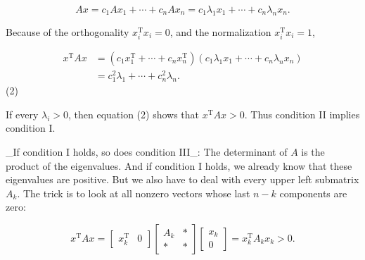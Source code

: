 \[Ax=c_{1}Ax_{1}+\cdots+c_{n}Ax_{n}=c_{1}\lambda_{1}x_{1}+\cdots+c_{n}\lambda_{ n}x_{n}.\]

Because of the orthogonality \(x_{i}^{\mathrm{T}}x_{i}=0\), and the normalization \(x_{i}^{\mathrm{T}}x_{i}=1\),

\[\begin{split} x^{\mathrm{T}}Ax&=\left(c_{1}x_{1}^{ \mathrm{T}}+\cdots+c_{n}x_{n}^{\mathrm{T}}\right)\left(c_{1}\lambda_{1}x_{1}+ \cdots+c_{n}\lambda_{n}x_{n}\right)\\ &=c_{1}^{2}\lambda_{1}+\cdots+c_{n}^{2}\lambda_{n}.\end{split}\] (2)

If every \(\lambda_{i}>0\), then equation (2) shows that \(x^{\mathrm{T}}Ax>0\). Thus condition II implies condition I.

_If condition I holds, so does condition III_: The determinant of \(A\) is the product of the eigenvalues. And if condition I holds, we already know that these eigenvalues are positive. But we also have to deal with every upper left submatrix \(A_{k}\). The trick is to look at all nonzero vectors whose last \(n-k\) components are zero:

\[x^{\mathrm{T}}Ax=\begin{bmatrix}x_{k}^{\mathrm{T}}&0\end{bmatrix} \begin{bmatrix}A_{k}&*\\ *&*\end{bmatrix}\begin{bmatrix}x_{k}\\ 0\end{bmatrix}=x_{k}^{\mathrm{T}}A_{k}x_{k}>0.\] 
